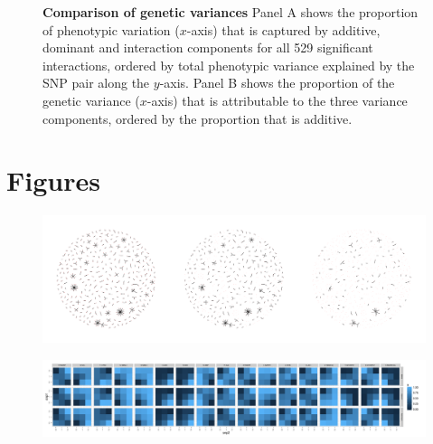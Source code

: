 \documentclass{article}
\begin{document}
\begin{figure}[H]
	\caption{\textbf{Comparison of genetic variances} Panel A shows the proportion of phenotypic variation ($x$-axis) that is captured by additive, dominant and interaction components for all 529 significant interactions, ordered by total phenotypic variance explained by the SNP pair along the $y$-axis. Panel B shows the proportion of the genetic variance ($x$-axis) that is attributable to the three variance components, ordered by the proportion that is additive.}
	\label{fig:variancecomponents}
\end{figure}


\clearpage
\section{Figures}
\setcounter{figure}{0}

\begin{figure}[H]
	\centering
	\includegraphics[width=5in]{hairballs_all_reps.pdf}
	\caption{}
\end{figure}
\clearpage

\begin{figure}
	\centering
	\includegraphics[width=5in]{gpbonfrep.pdf}
	\caption{}
\end{figure}
\clearpage
\end{document}
